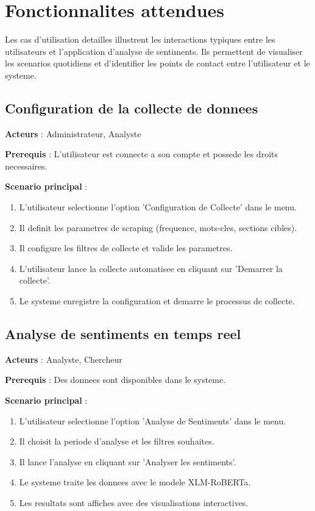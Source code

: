 \section{Fonctionnalites attendues}

Les cas d'utilisation detailles illustrent les interactions typiques entre les utilisateurs et l'application d'analyse de sentiments. Ils permettent de visualiser les scenarios quotidiens et d'identifier les points de contact entre l'utilisateur et le systeme.

\subsection{Configuration de la collecte de donnees}

\textbf{Acteurs} : Administrateur, Analyste

\textbf{Prerequis} : L'utilisateur est connecte a son compte et possede les droits necessaires.

\textbf{Scenario principal} :
\begin{enumerate}
    \item L'utilisateur selectionne l'option 'Configuration de Collecte' dans le menu.
    \item Il definit les parametres de scraping (frequence, mots-cles, sections cibles).
    \item Il configure les filtres de collecte et valide les parametres.
    \item L'utilisateur lance la collecte automatisee en cliquant sur 'Demarrer la collecte'.
    \item Le systeme enregistre la configuration et demarre le processus de collecte.
\end{enumerate}

\subsection{Analyse de sentiments en temps reel}

\textbf{Acteurs} : Analyste, Chercheur

\textbf{Prerequis} : Des donnees sont disponibles dans le systeme.

\textbf{Scenario principal} :
\begin{enumerate}
    \item L'utilisateur selectionne l'option 'Analyse de Sentiments' dans le menu.
    \item Il choisit la periode d'analyse et les filtres souhaites.
    \item Il lance l'analyse en cliquant sur 'Analyser les sentiments'.
    \item Le systeme traite les donnees avec le modele XLM-RoBERTa.
    \item Les resultats sont affiches avec des visualisations interactives.
\end{enumerate}


